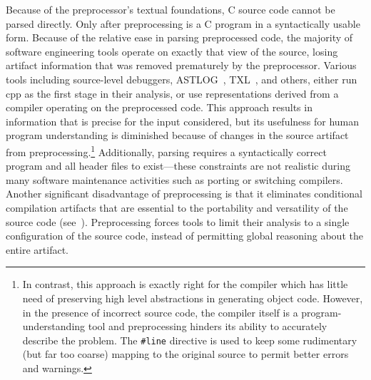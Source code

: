 \documentclass{article}
\newcommand{\Cpp}{\mbox{\textsf{cpp}}}
\newcommand{\C}{\mbox{\textsf{C}}}
\newcommand{\ppd}[1]{\texttt{\##1}}
\begin{document}
Because of the preprocessor's textual foundations, \C{} source code
cannot be parsed directly.  Only after preprocessing is a \C{}
program in a syntactically usable form. Because of the relative ease in
parsing preprocessed code, the majority of software engineering tools
operate on exactly that view of the source, losing artifact information
that was removed prematurely by the preprocessor.  Various tools including
source-level debuggers, ASTLOG~\cite{Crew97}, TXL~\cite{TXL}, and
others, either run \Cpp{} as the first stage in their
analysis, or use representations derived from a compiler operating on
the preprocessed code.  This approach results in information that is
precise for the input considered, but its usefulness for human
program understanding is diminished because of changes in the source
artifact from preprocessing.\footnote{In contrast, this approach is
  exactly right for the compiler which has little need of preserving
  high level abstractions in generating object code.  However, in the
  presence of incorrect source code, the compiler itself is a
  program-understanding tool and preprocessing hinders its ability to
  accurately describe the problem.  The \ppd{line} directive is used to
  keep some rudimentary (but far too coarse) mapping to the original
  source to permit better errors and warnings.}  Additionally,
parsing requires a syntactically correct program and all header files to
exist---these constraints are not realistic during many software
maintenance activities such as porting or switching compilers.
Another significant disadvantage of preprocessing is that it eliminates
conditional compilation artifacts that are essential to the portability
and versatility of the source code (see~\cite{Krone94}).  Preprocessing
forces tools to limit their analysis to a single configuration of the
source code, instead of permitting global reasoning about the entire
artifact.

\end{document}

